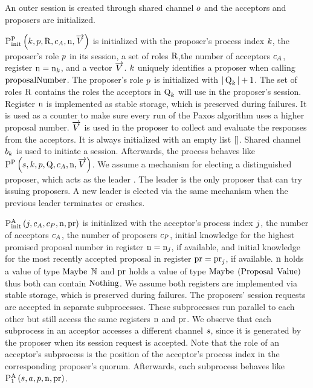 An outer session is created through shared channel $o$ and the acceptors and proposers are initialized.

$\textstyle\operatorname{P^{P}_{init}}\left(
    k,
    p,
    \operatorname{R},
    c_A,
    \operatorname{n},
    \overrightarrow{V}
\right)$ is initialized with the proposer's process index $k$, the proposer's role $p$ in its session, a set of roles $\operatorname{R}$,the number of acceptors $c_A$, register $\operatorname{n} = \operatorname{n}_{k}$, and a vector $\overrightarrow{V}$.
$k$ uniquely identifies a proposer when calling $\operatorname{proposalNumber}$.
The proposer's role $p$ is initialized with $|\operatorname{Q}_{k}| + 1$.
The set of roles $\operatorname{R}$ contains the roles the acceptors in $\operatorname{Q}_{k}$ will use in the proposer's session.
Register $\operatorname{n}$ is implemented as stable storage, which is preserved during failures.
It is used as a counter to make sure every run of the Paxos algorithm uses a higher proposal number.
$\overrightarrow{V}$ is used in the proposer to collect and evaluate the responses from the acceptors.
It is always initialized with an empty list $\mathtt{[]}$.
Shared channel $b_{k}$ is used to initiate a session.
Afterwards, the process behaves like $\operatorname{P^{P}_{}}\left(
    s,
    k,
    p,
    \operatorname{Q},
    c_A,
    \operatorname{n},
    \overrightarrow{V}
\right)$.
We assume a mechanism for electing a distinguished proposer, which acts as the leader \cite{Lamport01}.
The leader is the only proposer that can try issuing proposers.
A new leader is elected via the same mechanism when the previous leader terminates or crashes.

$\operatorname{P^{A}_{init}}\left(
    j,
    c_A,
    c_P,
    \operatorname{n},
    \operatorname{pr}
\right)$ is initialized with the acceptor's process index $j$, the number of acceptors $c_A$, the number of proposers $c_P$, initial knowledge for the highest promised proposal number in register $\operatorname{n} = \operatorname{n}_{j}$, if available, and initial knowledge for the most recently accepted proposal in register $\operatorname{pr} = \operatorname{pr}_{j}$, if available.
$\operatorname{n}$ holds a value of type $\operatorname{Maybe}\; \mathbb{N}$ and $\operatorname{pr}$ holds a value of type $\operatorname{Maybe}\; \left(\operatorname{Proposal}\; \operatorname{Value}\right)$ thus both can contain $\operatorname{Nothing}$.
We assume both registers are implemented via stable storage, which is preserved during failures.
The proposers' session requests are accepted in separate subprocesses.
These subprocesses run parallel to each other but still access the same registers $\operatorname{n}$ and $\operatorname{pr}$.
We observe that each subprocess in an acceptor accesses a different channel $s$, since it is generated by the proposer when its session request is accepted.
Note that the role of an acceptor's subprocess is the position of the acceptor's process index in the corresponding proposer's quorum.
Afterwards, each subprocess behaves like $\operatorname{P^{A}_{1}}\left(
    s,
    a,
    p,
    \operatorname{n},
    \operatorname{pr}
\right)$.

